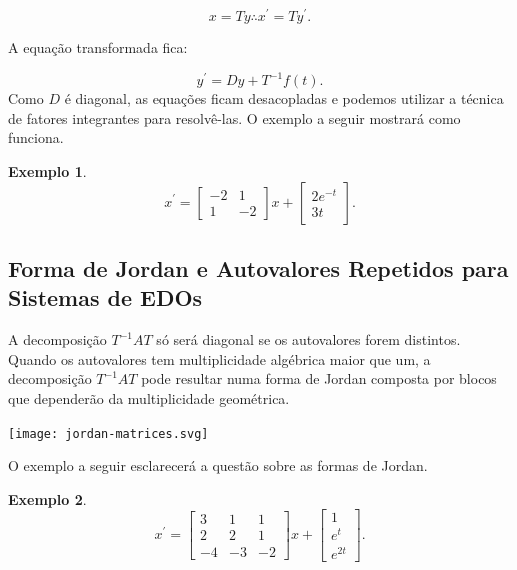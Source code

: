 \documentclass[a4paper,portuguese,9pt,final]{extarticle}
\newtheorem{example}{Exemplo}[section]
\begin{document}
\begin{multicols*}{2}
        $$x = Ty \therefore x^\prime = Ty^\prime.$$
        
        A equação transformada fica:
        
        $$y^\prime = Dy + T^{-1}f(t).$$ Como $D$ é diagonal, as equações ficam desacopladas e podemos utilizar a técnica de fatores integrantes para resolvê-las. O exemplo a seguir mostrará como funciona.
        
        \begin{example}
            \begin{equation*}
                x^\prime = \begin{bmatrix}
                                     -2 & 1\\
                                     1 & -2
                                     \end{bmatrix} x + \begin{bmatrix} 2e^{-t} \\ 3t\end{bmatrix}.
            \end{equation*}    
        \end{example}
        
        \subsection{Forma de Jordan e Autovalores Repetidos para Sistemas de EDOs}
        
            A decomposição $T^{-1}AT$ só será diagonal se os autovalores forem distintos. Quando os autovalores tem multiplicidade algébrica maior que um, a decomposição $T^{-1}AT$ pode resultar numa forma de Jordan composta por blocos que dependerão da multiplicidade geométrica.
            
            \texttt{[image: jordan-matrices.svg]}
            
            O exemplo a seguir esclarecerá a questão sobre as formas de Jordan.
        
            \begin{example}
                \begin{equation*}
                    x^\prime = \begin{bmatrix}
                                         3 & 1 &1\\
                                     2 & 2 & 1\\
                                    -4 & -3 & -2
                                     \end{bmatrix} x + \begin{bmatrix} 1 \\ e^{t} \\ e^{2t} \end{bmatrix}.
                \end{equation*}     
            \end{example}
            

\end{multicols*}
\end{document}
